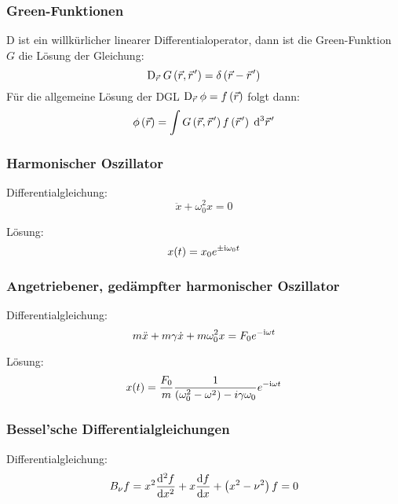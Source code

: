 \documentclass[11pt]{article}
\numberwithin{equation}{section}
\begin{document}
			\subsubsection{Green-Funktionen}
				\noindent
				$\mathrm{D}$ ist ein willkürlicher linearer Differentialoperator, dann ist die Green-Funktion $G$ die Lösung der Gleichung:
				\begin{equation}
					\mathrm{D}_{\pvec{r}}\, G\left(\vec{r},\pvec{r}'\right) = \delta\left(\vec{r} - \pvec{r}'\right)
				\end{equation}
				Für die allgemeine Lösung der DGL $\mathrm{D}_{\pvec{r}}\, \phi = f\left(\vec{r}\right)$ folgt dann:
				\begin{equation}
					\phi\left(\vec{r}\right) = \int G\left(\vec{r},\pvec{r}'\right)f\left(\pvec{r}'\right)\;\diff^3\pvec{r}'
				\end{equation}

			\subsubsection{Harmonischer Oszillator}
				\noindent
				Differentialgleichung:
				\begin{equation}
					\ddot{x}+\omega_0^2 x = 0
				\end{equation}

				\noindent
				Lösung:
				\begin{equation}
					x(t)=x_0 e^{\pm \mathrm{i}\omega_0 t}
				\end{equation}

			\subsubsection{Angetriebener, gedämpfter harmonischer Oszillator}
				\noindent
				Differentialgleichung:
				\begin{equation}
					m\ddot{x}+m\gamma\dot{x}+m\omega_0^2 x = F_0 e^{-\mathrm{i}\omega t}
				\end{equation}

				\noindent
				Lösung:
				\begin{equation}
					x(t) = \frac{F_0}{m} \frac{1}{\left(\omega_0^2-\omega^2\right)-i\gamma\omega_0} e^{-\mathrm{i}\omega t}
				\end{equation}

			\subsubsection{Bessel'sche Differentialgleichungen}
				\noindent
				Differentialgleichung:
				\begin{equation}
					B_\nu f = x^2\frac{\mathrm{d}^2 f}{\mathrm{d} x^2} + x\frac{\mathrm{d} f}{\mathrm{d} x}+\left(x^2-\nu^2\right)f = 0
				\end{equation}
\end{document}
